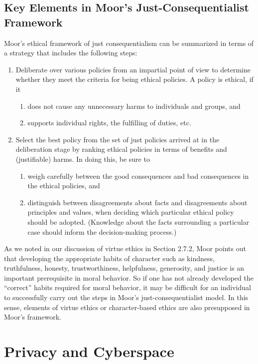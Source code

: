 \documentclass[12pt]{article}
\theoremstyle{definition}
\begin{document}
\subsection{Key Elements in Moor's Just-Consequentialist Framework}
Moor’s ethical framework of just consequentialism can be summarized in terms of a
strategy that includes the following steps:
\begin{enumerate}
\item Deliberate over various policies from an impartial point of view to determine
whether they meet the criteria for being ethical policies. A policy is ethical, if it
\begin{enumerate}
\item does not cause any unnecessary harms to individuals and groups, and
\item supports individual rights, the fulfilling of duties, etc.
\end{enumerate}
\item Select the best policy from the set of just policies arrived at in the deliberation
stage by ranking ethical policies in terms of benefits and (justifiable) harms. In
doing this, be sure to
\begin{enumerate}
\item weigh carefully between the good consequences and bad consequences in the
ethical policies, and
\item distinguish between disagreements about facts and disagreements about
principles and values, when deciding which particular ethical policy should
be adopted. (Knowledge about the facts surrounding a particular case should
inform the decision-making process.)
\end{enumerate}
\end{enumerate}
As we noted in our discussion of virtue ethics in Section 2.7.2, Moor points out that
developing the appropriate habits of character such as kindness, truthfulness, honesty,
trustworthiness, helpfulness, generosity, and justice is an important prerequisite in moral
behavior. So if one has not already developed the “correct” habits required for moral
behavior, it may be difficult for an individual to successfully carry out the steps in Moor’s
just-consequentialist model. In this sense, elements of virtue ethics or character-based
ethics are also presupposed in Moor’s framework.
\clearpage
\section{Privacy and Cyberspace}
\end{document}
